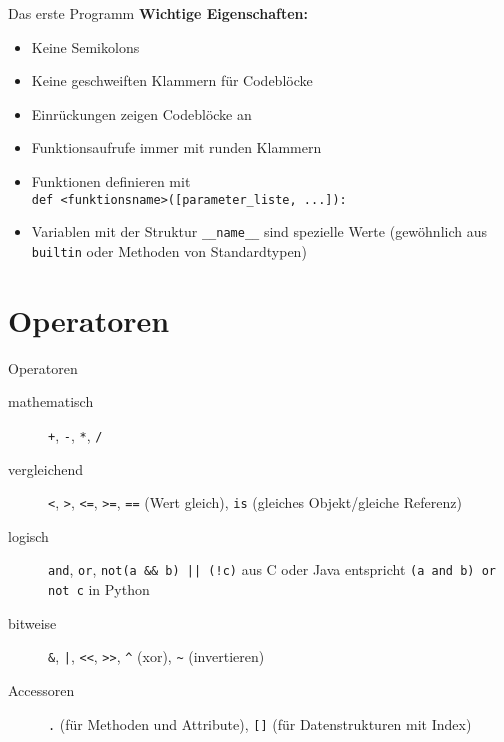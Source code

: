 \begin{frame}[fragile]{Das erste Programm}
	\textbf{Wichtige Eigenschaften:}
	\begin{itemize}
	    \item Keine Semikolons
	    \item Keine geschweiften Klammern für Codeblöcke
	    \item Einrückungen zeigen Codeblöcke an
	    \item Funktionsaufrufe immer mit runden Klammern
	    \item Funktionen definieren mit \\
	   		  \alert{\texttt{def <funktionsname>([parameter\_liste, ...]):}}
	    \item Variablen mit der Struktur \alert{\texttt{\_\_name\_\_}} sind spezielle Werte (gewöhnlich aus \alert{\texttt{builtin}} oder Methoden von Standardtypen)
	\end{itemize}
\end{frame}


\section{Operatoren}
\begin{frame}[fragile]{Operatoren}
	\begin{description}
	    \item[mathematisch] \alert{\texttt{+}}, \alert{\texttt{-}}, \alert{\texttt{*}}, \alert{\texttt{/}}
	    \item[vergleichend] \alert{\texttt{<}}, \alert{\texttt{>}}, \alert{\texttt{<=}}, \alert{\texttt{>=}}, \alert{\texttt{==}} (Wert gleich), \alert{\texttt{is}} (gleiches Objekt/gleiche Referenz)
	    \item[logisch] \alert{\texttt{and}}, \alert{\texttt{or}}, \alert{\texttt{not}}\alert{\texttt{(a \&\& b) || (!c)}} aus C oder Java entspricht \alert{\texttt{(a and b) or not c}} in Python
	    \item[bitweise] \alert{\texttt{\&}}, \alert{\texttt{|}}, \alert{\texttt{<<}}, \alert{\texttt{>>}}, \alert{\texttt{\^}} (xor), \alert{\texttt{\~}} (invertieren)
	    \item[Accessoren] \alert{\texttt{.}} (für Methoden und Attribute), \alert{\texttt{[]}} (für Datenstrukturen mit Index)
	\end{description}
\end{frame}


